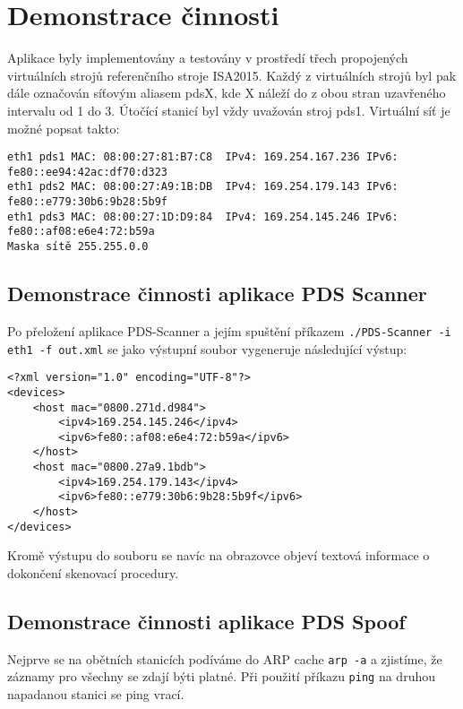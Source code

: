 \documentclass[a4paper, 11pt]{article}
\begin{document}
\section{Demonstrace činnosti}
\par{Aplikace byly implementovány a testovány v prostředí třech propojených virtuálních strojů referenčního stroje ISA2015. Každý z virtuálních strojů byl pak dále označován síťovým aliasem pdsX, kde X náleží do z obou stran uzavřeného intervalu od 1 do 3. Útočící stanicí byl vždy uvažován stroj pds1. Virtuální síť je možné popsat takto:}

\begin{Verbatim}
eth1 pds1 MAC: 08:00:27:81:B7:C8  IPv4: 169.254.167.236 IPv6: fe80::ee94:42ac:df70:d323
eth1 pds2 MAC: 08:00:27:A9:1B:DB  IPv4: 169.254.179.143 IPv6: fe80::e779:30b6:9b28:5b9f
eth1 pds3 MAC: 08:00:27:1D:D9:84  IPv4: 169.254.145.246 IPv6: fe80::af08:e6e4:72:b59a
Maska sítě 255.255.0.0
\end{Verbatim}

\subsection{Demonstrace činnosti aplikace PDS Scanner}
\par{Po přeložení aplikace PDS-Scanner a jejím spuštění příkazem \texttt{./PDS\--Scanner \--i eth1 \--f out.xml} se jako výstupní soubor vygeneruje následující výstup:}
\begin{Verbatim}
<?xml version="1.0" encoding="UTF-8"?>
<devices>
    <host mac="0800.271d.d984">
        <ipv4>169.254.145.246</ipv4>
        <ipv6>fe80::af08:e6e4:72:b59a</ipv6>
    </host>
    <host mac="0800.27a9.1bdb">
        <ipv4>169.254.179.143</ipv4>
        <ipv6>fe80::e779:30b6:9b28:5b9f</ipv6>
    </host>
</devices>
\end{Verbatim}

\par{Kromě výstupu do souboru se navíc na obrazovce objeví textová informace o dokončení skenovací procedury.}


\subsection{Demonstrace činnosti aplikace PDS Spoof}
\par{Nejprve se na obětních stanicích podíváme do ARP cache \texttt{arp \--a} a zjistíme, že záznamy pro všechny se zdají býti platné. Při použití příkazu \texttt{ping} na druhou napadanou stanici se ping vrací.}
\end{document}
